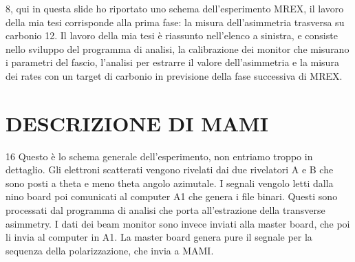 \documentclass[11pt,a4paper]{article}
\begin{document}
\begin{list}{\textbf{slide}}{}
\item 8, qui in questa slide ho riportato uno schema dell'esperimento MREX, il lavoro della mia tesi corrisponde alla prima fase: la misura dell'asimmetria trasversa su carbonio 12. Il lavoro della mia tesi è riassunto nell'elenco a sinistra, e consiste nello sviluppo del programma di analisi, la calibrazione dei monitor che misurano i parametri del fascio, l'analisi per estrarre il valore dell'asimmetria e la misura dei rates con un target di carbonio in previsione della fase successiva di MREX.
\end{list}

\section{DESCRIZIONE DI MAMI}
\begin{list}{\textbf{slide}}{}
\item

\item

\item

\item

\item

\item

\item

\item 16 Questo è lo schema generale dell'esperimento, non entriamo troppo in dettaglio. Gli elettroni scatterati vengono rivelati dai due rivelatori A e B che sono posti a theta e meno theta angolo azimutale. I segnali vengolo letti dalla nino board poi comunicati al computer A1 che genera i file binari. Questi sono processati dal programma di analisi che porta all'estrazione della transverse asimmetry. I dati dei beam monitor sono invece inviati alla master board, che poi li invia al computer in A1. La master board genera pure il segnale per la sequenza della polarizzazione, che invia a MAMI.
\end{list}
\end{document}
